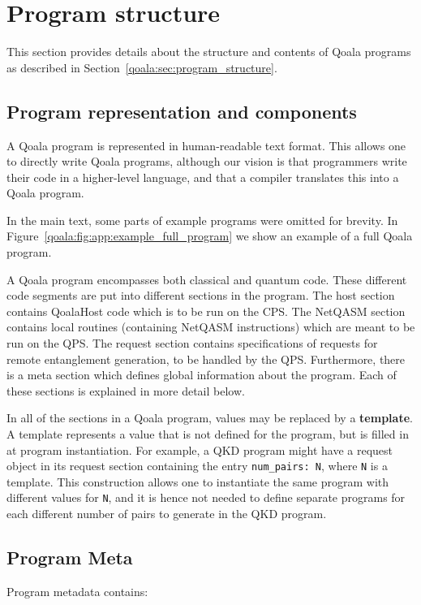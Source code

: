 \section{Program structure}
\label{qoala:sec:app:program_structure}
This section provides details about the structure and contents of Qoala programs as described in Section~\ref{qoala:sec:program_structure}.


\subsection{Program representation and components}
A Qoala program is represented in human-readable text format.
This allows one to directly write Qoala programs, although our vision is that programmers write their code in a higher-level language, and that a compiler translates this into a Qoala program.

In the main text, some parts of example programs were omitted for brevity.
In Figure~\ref{qoala:fig:app:example_full_program} we show an example of a full Qoala program.

A Qoala program encompasses both classical and quantum code.
These different code segments are put into different sections in the program.
The host section contains QoalaHost code which is to be run on the CPS.
The NetQASM section contains local routines (containing NetQASM instructions) which are meant to be run on the QPS.
The request section contains specifications of requests for remote entanglement generation, to be handled by the QPS.
Furthermore, there is a meta section which defines global information about the program.
Each of these sections is explained in more detail below.

In all of the sections in a Qoala program, values may be replaced by a \textbf{template}.
A template represents a value that is not defined for the program, but is filled in at program instantiation. For example, a QKD program might have a request object in its request section containing the entry \texttt{num\_pairs: {N}}, where \texttt{{N}} is a template. This construction allows one to instantiate the same program with different values for \texttt{N}, and it is hence not needed to define separate programs for each different number of pairs to generate in the QKD program.

\subsection{Program Meta}
Program metadata contains:

